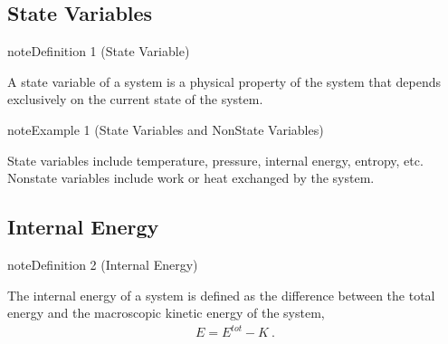 \documentclass[letterpaper,10pt,english]{jupyterBook}
\begin{document}
\subsection{State Variables}
\label{\detokenize{ch/principles-gibbs-phase-rule:state-variables}}\label{\detokenize{ch/principles-gibbs-phase-rule:physics-hs-thermodynamics-foundation-principles-gibbs-phase-rule-state-vars}}\label{ch/principles-gibbs-phase-rule:definition-0}
\begin{sphinxadmonition}{note}{Definition 1 (State Variable)}



\sphinxAtStartPar
A state variable of a system is a physical property of the system that depends exclusively on the current state of the system.
\end{sphinxadmonition}
\label{ch/principles-gibbs-phase-rule:example-1}
\begin{sphinxadmonition}{note}{Example 1 (State Variables and Non\sphinxhyphen{}State Variables)}



\sphinxAtStartPar
State variables include temperature, pressure, internal energy, entropy, etc.
Non\sphinxhyphen{}state variables include work or heat exchanged by the system. 
\end{sphinxadmonition}


\subsection{Internal Energy}
\label{\detokenize{ch/principles-gibbs-phase-rule:internal-energy}}\label{\detokenize{ch/principles-gibbs-phase-rule:physics-hs-thermodynamics-foundation-principles-gibbs-phase-rule-internal-energy}}\label{ch/principles-gibbs-phase-rule:definition-2}
\begin{sphinxadmonition}{note}{Definition 2 (Internal Energy)}



\sphinxAtStartPar
The internal energy of a system is defined as the difference between the total energy and the macroscopic kinetic energy of the system,
\begin{equation*}
\begin{split}E = E^{tot} - K \ .\end{split}
\end{equation*}\end{sphinxadmonition}
\end{document}
